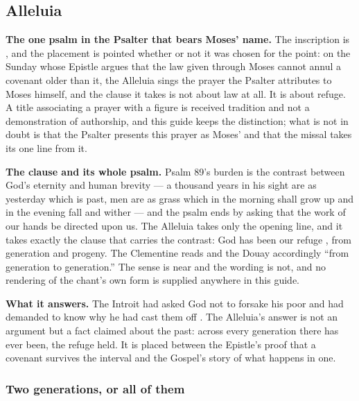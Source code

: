 \elementguard
\subsection*{Alleluia }


\textbf{The one psalm in the Psalter that bears Moses' name.} The inscription
is , and the placement is pointed whether or
not it was chosen for the point: on the Sunday whose Epistle argues that the
law given through Moses cannot annul a covenant older than it, the Alleluia
sings the prayer the Psalter attributes to Moses himself, and the clause it
takes is not about law at all. It is about refuge. A title associating a
prayer with a figure is received tradition and not a demonstration of
authorship, and this guide keeps the distinction; what is not in doubt is that
the Psalter presents this prayer as Moses' and that the missal takes its one
line from it.

\textbf{The clause and its whole psalm.} Psalm 89's burden is the contrast
between God's eternity and human brevity --- a thousand years in his sight are
as yesterday which is past, men are as grass which in the morning shall grow up
and in the evening fall and wither --- and the psalm ends by asking that the
work of our hands be directed upon us. The Alleluia takes only the opening
line, and it takes exactly the clause that carries the contrast: God has been
our refuge , from generation and progeny. The
Clementine reads  and the Douay
accordingly ``from generation to generation.'' The sense is near and the
wording is not, and no rendering of the chant's own form is supplied anywhere
in this guide.

\textbf{What it answers.} The Introit had asked God not to forsake his poor
 and had demanded to know why he had cast them off
. The Alleluia's answer is not an argument but a fact claimed
about the past: across every generation there has ever been, the refuge held.
It is placed between the Epistle's proof that a covenant survives the interval
and the Gospel's story of what happens in one.

\subsubsection*{Two generations, or all of them}

